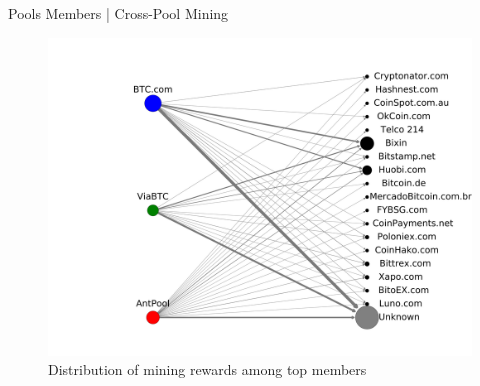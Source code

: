 \documentclass[10pt]{beamer}
\begin{document}

\begin{frame}[fragile]{Pools Members | Cross-Pool Mining}
    \begin{figure}
        \includegraphics[width=0.8\columnwidth]{images/payments_graph_400.pdf}
        \\Distribution of mining rewards among top members
    \end{figure}
\end{frame}
\end{document}
